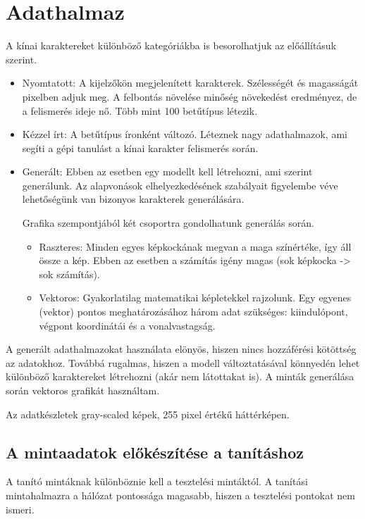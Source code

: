 
\section{Adathalmaz}

A kínai karaktereket különböző kategóriákba is besorolhatjuk az előállításuk szerint.
\begin{itemize}
\item Nyomtatott: A kijelzőkön megjelenített karakterek. Szélességét és magasságát pixelben adjuk meg. A felbontás növelése minőség növekedést eredményez, de a felismerés ideje nő. Több mint 100 betűtípus létezik.
\item Kézzel írt: A betűtípus íronként változó. Léteznek nagy adathalmazok, ami segíti a gépi tanulást a kínai karakter felismerés során.
\item Generált: Ebben az esetben egy modellt kell létrehozni, ami szerint generálunk. Az alapvonások elhelyezkedésének szabályait figyelembe véve lehetőségünk van bizonyos karakterek generálására.

Grafika szempontjából két csoportra gondolhatunk generálás során.
	\begin{itemize}
	\item Raszteres: Minden egyes képkockának megvan a maga színértéke, így áll össze a kép. Ebben az esetben a számítás igény magas (sok képkocka -> sok számítás).
	\item Vektoros: Gyakorlatilag matematikai képletekkel rajzolunk. Egy egyenes (vektor) pontos meghatározásához három adat szükséges: kiindulópont, végpont koordinátái és a vonalvastagság.
	\end{itemize}
\end{itemize}

A generált adathalmazokat használata elönyös, hiszen nincs hozzáférési kötöttség az adatokhoz. Továbbá rugalmas, hiszen a modell változtatásával könnyedén lehet különböző karaktereket létrehozni (akár nem látottakat is). A minták generálása során vektoros grafikát használtam.

Az adatkészletek gray-scaled képek, 255 pixel értékű háttérképen.

\subsection{A mintaadatok előkészítése a tanításhoz}

A tanító mintáknak különböznie kell a tesztelési mintáktól. A tanítási mintahalmazra a hálózat pontossága magasabb, hiszen a tesztelési pontokat nem ismeri.


